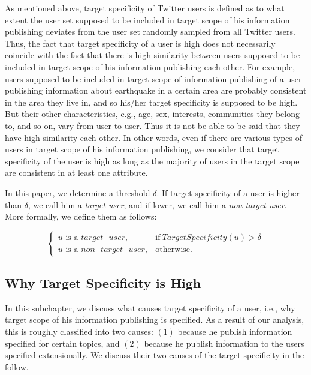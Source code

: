 As mentioned above, target specificity of Twitter users is defined
as to what extent the user set supposed to be included in target scope
of his information publishing deviates from the user set randomly
sampled from all Twitter users.  Thus, the fact that target
specificity of a user is high does not necessarily coincide with the
fact that there is high similarity between users supposed to
be included in target scope of his information publishing each
other.  For example, users supposed to be included in target scope of
information publishing of a user publishing information about
earthquake in a certain area are probably consistent in the area they live in,
and so his/her target specificity is supposed to be high.  But their
other characteristics, e.g., age, sex, interests, communities they
belong to, and so on, vary from user to user.  Thus it is not be able to
be said that they have high similarity each other.  In other words, even
if there are various types of users in target scope of his
information publishing, we consider that target specificity of the
user is high as long as the majority of users in the target scope are
consistent in at least one attribute.

In this paper, we determine a threshold $\delta$. If target
specificity of a user is higher than $\delta$, we call him a
\emph{target user}, and if lower, we call him a \emph{non target
user}.  More formally, we define them as follows:

\vspace{-1ex}
\[
  \begin{cases}
   u\mbox{ is a } target\mbox{ }user, & \mbox{if}\
   \mathit{TargetSpecificity}(u) > \delta \\
   u\mbox{ is a }non\mbox{ }target\mbox{ }user, & \mbox{otherwise}.
  \end{cases}
\]
\vspace{-2ex}

\subsection{Why Target Specificity is High}
\label{subsec:The Causes}

In this subchapter, we discuss what causes target specificity of a
user, i.e., why target scope of his information publishing is
specified.  As a result of our analysis, this is roughly classified into
two causes: $(1)$ because he publish information specified for certain
topics, and $(2)$ because he publish information to the users
specified extensionally.  We discuss their two causes of the target
specificity in the follow.

